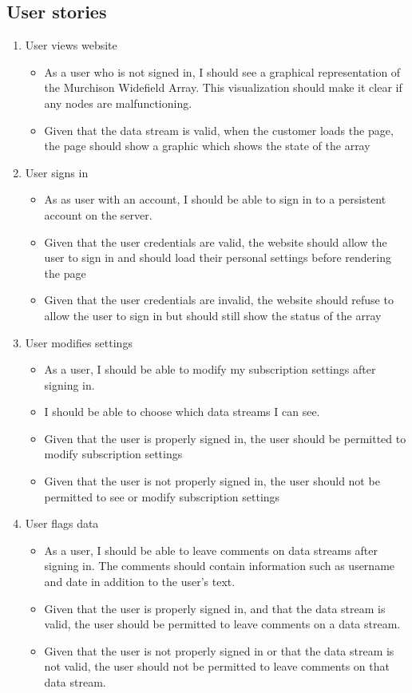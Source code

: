 \documentclass[12pt]{article}
\begin{document}
\begin{spacing}{1.5}
\subsection{User stories}
\begin{enumerate}
\item User views website
	\begin{itemize}
		\item As a user who is not signed in, I should see a graphical representation of the Murchison Widefield Array. This visualization should make it clear if any nodes are malfunctioning.
		\item Given that the data stream is valid, when the customer loads the page, the page should show a graphic which shows the state of the array
	\end{itemize}
\item User signs in
	\begin{itemize}
        		\item As as user with an account, I should be able to sign in to a persistent account on the server.
        		\item Given that the user credentials are valid, the website should allow the user to sign in and should load their personal settings before rendering the page
		\item Given that the user credentials are invalid, the website should refuse to allow the user to sign in but should still show the status of the array
	\end{itemize}
\item User modifies settings
	\begin{itemize}
		\item As a user, I should be able to modify my subscription settings after signing in.
		\item I should be able to choose which data streams I can see.
		\item Given that the user is properly signed in, the user should be permitted to modify subscription settings
		\item Given that the user is not properly signed in, the user should not be permitted to see or modify subscription settings
	\end{itemize}
\item User flags data
	\begin{itemize}
		\item As a user, I should be able to leave comments on data streams after signing in. The comments should contain information such as username and date in addition to the user's text.
		\item Given that the user is properly signed in, and that the data stream is valid, the user should be permitted to leave comments on a data stream.
		\item Given that the user is not properly signed in or that the data stream is not valid, the user should not be permitted to leave comments on that data stream.
	\end{itemize}
\end{enumerate}


\end{spacing}
\end{document}
